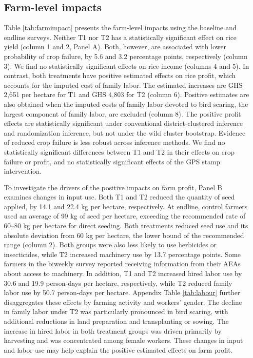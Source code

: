 \documentclass[11pt]{article}
\begin{document}
\subsection{Farm-level impacts}

Table \ref{tab:farmimpact} presents the farm-level impacts using the baseline and endline surveys. Neither T1 nor T2 has a statistically significant effect on rice yield (column 1 and 2, Panel A). Both, however, are associated with lower probability of crop failure, by 5.6 and 3.2 percentage points, respectively (column 3). We find no statistically significant effects on rice income (columns 4 and 5). In contrast, both treatments have positive estimated effects on rice profit, which accounts for the imputed cost of family labor. The estimated increases are GHS 2,651 per hectare for T1 and GHS 4,803 for T2 (column 6). Positive estimates are also obtained when the imputed costs of family labor devoted to bird scaring, the largest component of family labor, are excluded (column 8). %
The positive profit effects are statistically significant under conventional district-clustered inference and randomization inference, but not under the wild cluster bootstrap. Evidence of reduced crop failure is less robust across inference methods. We find no statistically significant differences between T1 and T2 in their effects on crop failure or profit, and no statistically significant effects of the GPS stamp intervention.

To investigate the drivers of the positive impacts on farm profit, Panel B examines changes in input use. Both T1 and T2 reduced the quantity of seed applied, by 14.1 and 22.4 kg per hectare, respectively. At endline, control farmers used an average of 99 kg of seed per hectare, exceeding the recommended rate of 60--80 kg per hectare for direct seeding. Both treatments reduced seed use and its absolute deviation from 60 kg per hectare, the lower bound of the recommended range (column 2). Both groups were also less likely to use herbicides or insecticides, while T2 increased machinery use by 13.7 percentage points. Some farmers in the biweekly survey reported receiving information from their AEAs about access to machinery. In addition, T1 and T2 increased hired labor use by 30.6 and 19.9 person-days per hectare, respectively, while T2 reduced family labor use by 50.7 person-days per hectare. Appendix Table \ref{tab:labour} further disaggregates these effects by farming activity and workers' gender. The decline in family labor under T2 was particularly pronounced in bird scaring, with additional reductions in land preparation and transplanting or sowing. The increase in hired labor in both treatment groups was driven primarily by harvesting and was concentrated among female workers. These changes in input and labor use may help explain the positive estimated effects on farm profit.  
\end{document}
